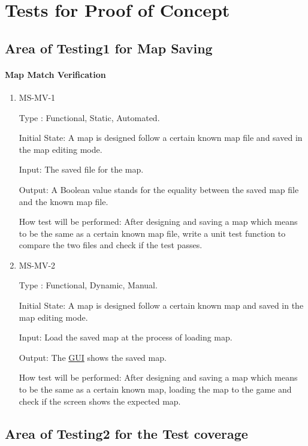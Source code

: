 \documentclass[12pt, titlepage]{article}
\begin{document}
\section{Tests for Proof of Concept}

\subsection{Area of Testing1 for Map Saving}
		
\paragraph{Map Match Verification}

\begin{enumerate}
\item{MS-MV-1}

Type : Functional, Static, Automated.

Initial State: A map is designed follow a certain known map file and saved in the map editing mode.

Input: The saved file for the map.

Output: A Boolean value stands for the equality between the saved map file and the known map file.

How test will be performed: After designing and saving a map which means to be the same as a certain known map file, write a unit test function to compare the two files and check if the test passes.

\item{MS-MV-2}

Type : Functional, Dynamic, Manual.

Initial State: A map is designed follow a certain known map and saved in the map editing mode.

Input: Load the saved map at the process of loading map.

Output: The \underline{GUI} shows the saved map.

How test will be performed: After designing and saving a map which means to be the same as a certain known map, loading the map to the game and check if the screen shows the expected map.

\end{enumerate}

\subsection{Area of Testing2 for the Test coverage}
\end{document}
